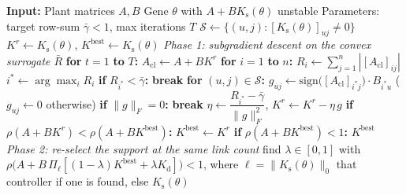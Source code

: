 \documentclass[letterpaper, 10pt, conference]{ieeeconf}
\begin{document}

\begin{algorithm}%
\caption{Alternative controller for unstable genes}
\label{alg:gers-repair}
\begin{algorithmic}[1]
\Statex \textbf{Input:} 
\Statex \quad Plant matrices $A, B$
\Statex \quad Gene $\theta$ with $A+BK_\mathrm{s}(\theta)$ unstable
\Statex \quad Parameters: target row-sum $\bar{\gamma} < 1$, max iterations $T$
\State $\mathcal{S} \gets \{(u,j) : [K_\mathrm{s}(\theta)]_{uj} \neq 0\}$
\State $K^r \gets K_\mathrm{s}(\theta)$, \; $K^{\mathrm{best}} \gets K_\mathrm{s}(\theta)$
\Statex \textit{Phase 1: subgradient descent on the convex surrogate $\bar{R}$}
\State \textbf{for} $t = 1$ \textbf{to} $T$\textbf{:}
\State \quad $A_{\mathrm{cl}} \gets A + BK^r$
\State \quad \textbf{for} $i = 1$ \textbf{to} $n$\textbf{:}
\State \quad \quad $R_i \gets \sum_{j=1}^{n} |[A_{\mathrm{cl}}]_{ij}|$
\State \quad $i^* \gets \arg\max_i R_i$
\State \quad \textbf{if} $R_{i^*} < \bar{\gamma}$\textbf{:} \textbf{break}
\State \quad \textbf{for} $(u,j) \in \mathcal{S}$\textbf{:}
\State \quad \quad $g_{uj} \gets \mathrm{sign}\bigl([A_{\mathrm{cl}}]_{i^* j}\bigr) \cdot B_{i^* u}$
       \quad ($g_{uj} \gets 0$ otherwise)
\State \quad \textbf{if} $\|g\|_F = 0$\textbf{:} \textbf{break} 
\State \quad $\eta \gets \dfrac{R_{i^*} - \bar{\gamma}}{\|g\|_F^2}$, \quad
       $K^r \gets K^r - \eta \, g$
\State \quad \textbf{if} $\rho(A+BK^r) < \rho(A+BK^{\mathrm{best}})$\textbf{:} $K^{\mathrm{best}} \gets K^r$
\State \textbf{if} $\rho(A + BK^{\mathrm{best}}) < 1$\textbf{:} \Return $K^{\mathrm{best}}$
\Statex \textit{Phase 2: re-select the support at the same link count}
\State find $\lambda\in[0,1]$ with
       $\rho\bigl(A+B\,\Pi_{\ell}[(1-\lambda)K^{\mathrm{best}} + \lambda K_{\mathrm{d}}]\bigr) < 1$,
       where $\ell = \|K_\mathrm{s}(\theta)\|_0$
\State \Return that controller if one is found, else $K_\mathrm{s}(\theta)$
\end{algorithmic}
\end{algorithm}
\end{document}
